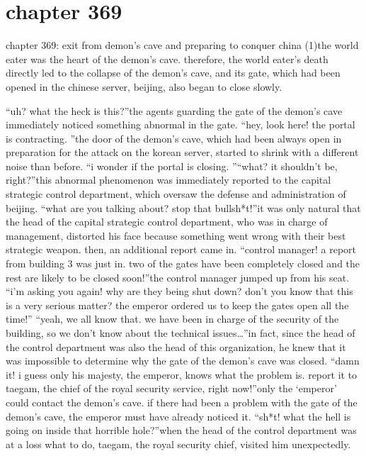 \section{chapter 369}

chapter 369: exit from demon’s cave and preparing to conquer china (1)the world eater was the heart of the demon’s cave.
 therefore, the world eater’s death directly led to the collapse of the demon’s cave, and its gate, which had been opened in the chinese server, beijing, also began to close slowly.





“uh? what the heck is this?”the agents guarding the gate of the demon’s cave immediately noticed something abnormal in the gate.
“hey, look here! the portal is contracting.
”the door of the demon’s cave, which had been always open in preparation for the attack on the korean server, started to shrink with a different noise than before.
“i wonder if the portal is closing.
”“what? it shouldn’t be, right?”this abnormal phenomenon was immediately reported to the capital strategic control department, which oversaw the defense and administration of beijing.
“what are you talking about? stop that bullsh*t!”it was only natural that the head of the capital strategic control department, who was in charge of management, distorted his face because something went wrong with their best strategic weapon.
then, an additional report came in.
“control manager! a report from building 3 was just in.
 two of the gates have been completely closed and the rest are likely to be closed soon!”the control manager jumped up from his seat.
“i’m asking you again! why are they being shut down? don’t you know that this is a very serious matter? the emperor ordered us to keep the gates open all the time!”
“yeah, we all know that.
 we have been in charge of the security of the building, so we don’t know about the technical issues…”in fact, since the head of the control department was also the head of this organization, he knew that it was impossible to determine why the gate of the demon’s cave was closed.
“damn it! i guess only his majesty, the emperor, knows what the problem is.
 report it to taegam, the chief of the royal security service, right now!”only the ‘emperor’ could contact the demon’s cave.
 if there had been a problem with the gate of the demon’s cave, the emperor must have already noticed it.
“sh*t! what the hell is going on inside that horrible hole?”when the head of the control department was at a loss what to do, taegam, the royal security chief, visited him unexpectedly.
